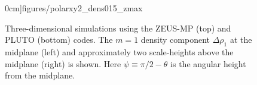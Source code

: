 \begin{figure}
\begin{center}
{      0cm]{figures/polarxy2_dens015_zmax}  
    }
  \end{center}
  \caption{Three-dimensional simulations using the ZEUS-MP (top) and 
    PLUTO (bottom) codes. The $m=1$ density component $\Delta\rho_1$
    at the midplane (left) and approximately 
    two scale-heights above the midplane (right) is shown. Here $\psi
    \equiv \pi/2 - \theta$ is the angular height  
    from the midplane. \label{3d_prelim}}   
\end{figure}

